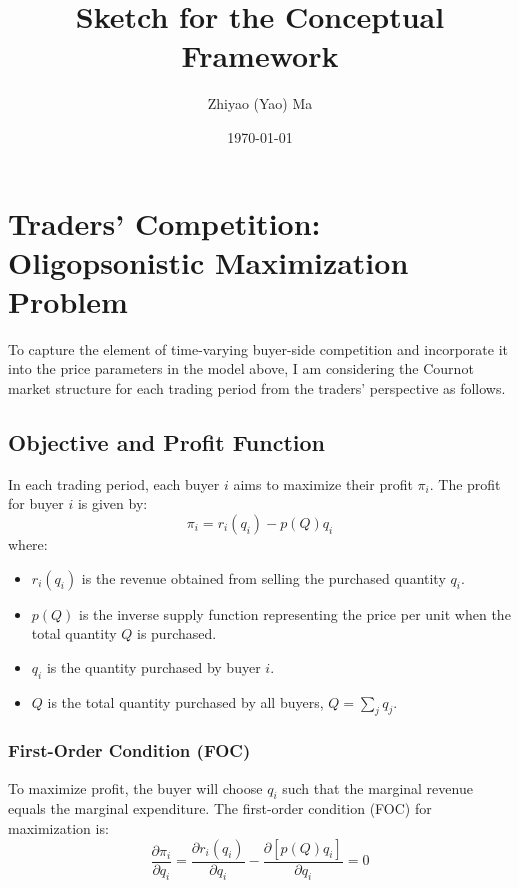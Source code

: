 \documentclass[12pt]{article}
\title{Sketch for the Conceptual Framework}
\author[1]{Zhiyao (Yao) Ma}
\affil[1]{UC Davis}
\date{\today}
\begin{document}
\maketitle
\tableofcontents
\newpage






\newpage
\section{Traders' Competition: Oligopsonistic Maximization Problem}

To capture the element of time-varying buyer-side competition and incorporate it into the price parameters in the model above, I am considering the Cournot market structure for each trading period from the traders' perspective as follows. 

\subsection{Objective and Profit Function}
In each trading period, each buyer \( i \) aims to maximize their profit \( \pi_i \). The profit for buyer \( i \) is given by:
\begin{equation}
\pi_i = r_i(q_i) - p(Q) q_i
\end{equation}
where:
\begin{itemize}
  \item \( r_i(q_i) \) is the revenue obtained from selling the purchased quantity \( q_i \).
  \item \( p(Q) \) is the inverse supply function representing the price per unit when the total quantity \( Q \) is purchased.
  \item \( q_i \) is the quantity purchased by buyer \( i \).
  \item \( Q \) is the total quantity purchased by all buyers, \( Q = \sum_{j} q_j \).
\end{itemize}

\subsubsection{First-Order Condition (FOC)}
To maximize profit, the buyer will choose \( q_i \) such that the marginal revenue equals the marginal expenditure. The first-order condition (FOC) for maximization is:
\begin{equation}
\frac{\partial \pi_i}{\partial q_i} = \frac{\partial r_i(q_i)}{\partial q_i} - \frac{\partial [p(Q) q_i]}{\partial q_i} = 0
\end{equation}
\end{document}
